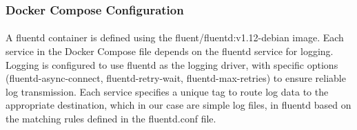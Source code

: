 \subsubsection*{Docker Compose Configuration}
\paragraph{} A fluentd container is defined using the fluent/fluentd:v1.12-debian image. Each service in the Docker Compose file depends on the fluentd service for logging. Logging is configured to use fluentd as the logging driver, with specific options (fluentd-async-connect, fluentd-retry-wait, fluentd-max-retries) to ensure reliable log transmission. Each service specifies a unique tag to route log data to the appropriate destination, which in our case are simple log files, in fluentd based on the matching rules defined in the fluentd.conf file.
